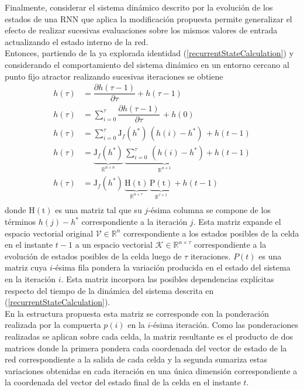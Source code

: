 \documentclass{article}
\begin{document}
	Finalmente, considerar el sistema dinámico descrito por la evolución de los estados de una RNN que aplica la modificación propuesta permite generalizar el efecto de realizar sucesivas evaluaciones sobre los mismos valores de entrada actualizando el estado interno de la red.\\
	Entonces, partiendo de la ya explorada identidad (\ref{recurrentStateCalculation}) y considerando el comportamiento del sistema dinámico en un entorno cercano al punto fijo atractor realizando sucesivas iteraciones se obtiene
	\begin{equation}\label{iterativeTransformation}
	\begin{split}
	h(\tau) &= \dfrac{\partial h(\tau -1)}{\partial \tau} + h(\tau -1)\\
	h(\tau) &= \sum_{i = 0}^{\tau} \dfrac{\partial h(\tau -1)}{\partial \tau} \, + h(0)\\
	h(\tau) &= \sum_{i = 0}^{\tau} \mathrm{J}_f(h^*) \, (h(i) - h^*) \, + h(t-1)\\
	h(\tau) &= \underbrace{\mathrm{J}_f(h^*)}_{ \mathbb{R}^{n \times n}} \, \underbrace{\sum_{i = 0}^{\tau} \, (h(i) - h^*)}_{\mathbb{R}^{n \times 1}} + h(t-1)\\
	h(\tau) &= \mathrm{J}_f(h^*) \, \underbrace{\mathrm{H(t)}}_{\mathbb{R}^{n \times \tau }} \, \underbrace{\mathrm{P(t)}}_{\mathbb{R}^{\tau \times 1 }} + h(t-1)\\
	\end{split}
	\end{equation}
	donde $\mathrm{H(t)}$ es una matriz tal que su $j$-ésima columna se compone de los términos $h(j) - h^*$ correspondiente a la iteración $j$. Esta matriz expande el espacio vectorial original $\mathcal{V} \in \mathbb{R}^n$ correspondiente a los estados posibles de la celda en el instante $t-1$ a un espacio vectorial $\mathcal{K} \in \mathbb{R}^{n \times \tau}$ correspondiente a la evolución de estados posibles de la celda luego de $\tau$ iteraciones.
	$P(t)$ es una matriz cuya $i$-ésima fila pondera la variación producida en el estado del sistema en la iteración $i$. Esta matriz incorpora las posibles dependencias explícitas respecto del tiempo de la dinámica del sistema descrita en (\ref{recurrentStateCalculation}). \\
	En la estructura propuesta esta matriz se corresponde con la ponderación realizada por la compuerta $p(i)$ en la $i$-ésima iteración. Como las ponderaciones realizadas se aplican sobre cada celda, la matriz resultante es el producto de dos matrices donde la primera pondera cada coordenada del vector de estado de la red correspondiente a la salida de cada celda y la segunda sumariza estas variaciones obtenidas en cada iteración en una única dimensión correspondiente a la coordenada del vector del estado final de la celda en el instante $t$.\\
	
\end{document}

